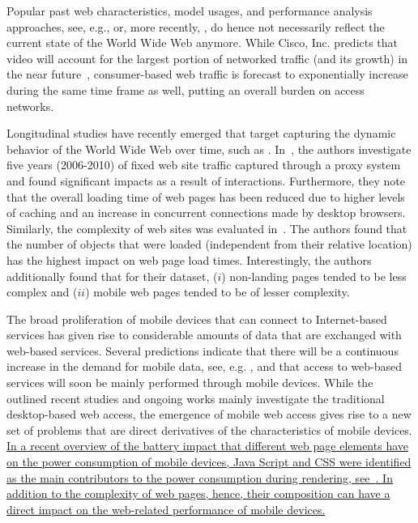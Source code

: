 \documentclass[onecolumn,12pt]{IEEEtran}
\begin{document}
Popular past web characteristics, model usages, and performance analysis approaches, see, e.g., \cite{BaCr98} or, more recently, \cite{LiZhZhChGr10}, do hence not necessarily reflect the current state of the World Wide Web anymore.
While Cisco, Inc. predicts that video will account for the largest portion of networked traffic (and its growth) in the near future~\cite{Ci13}, consumer-based web traffic is forecast to exponentially increase during the same time frame as well, putting an overall burden on access networks.

Longitudinal studies have recently emerged that target capturing the dynamic behavior of the World Wide Web over time, such as \cite{CaAlPa10}.
In~\cite{IhPa11}, the authors investigate five years (2006-2010) of fixed web site traffic captured through a proxy system and found significant impacts as a result of interactions.
Furthermore, they note that the overall loading time of web pages has been reduced due to higher levels of caching and an increase in concurrent connections made by desktop browsers.
Similarly, the complexity of web sites was evaluated in~\cite{BuMaSe11,BuMaSe13}. The authors found that the number of objects that were loaded (independent from their relative location) has the highest impact on web page load times.
Interestingly, the authors additionally found that for their dataset, ($i$) non-landing pages tended to be less complex and ($ii$) mobile web pages tended to be of lesser complexity.


The broad proliferation of mobile devices that can connect to Internet-based services has given rise to considerable amounts of data that are exchanged with web-based services. 
Several predictions indicate that there will be a continuous increase in the demand for mobile data, see, e.g. \cite{Ci13}, and that access to web-based services will soon be mainly performed through mobile devices.
While the outlined recent studies and ongoing works mainly investigate the traditional desktop-based web access, the emergence of mobile web access gives rise to a new set of problems that are direct derivatives of the characteristics of mobile devices.
\uline{In a recent overview of the battery impact that different web page elements have on the power consumption of mobile devices, Java Script and CSS were identified as the main contributors to the power consumption during rendering, see~\cite{ThAgNiBoSi12}.
In addition to the complexity of web pages, hence, their composition can have a direct impact  on the web-related performance of mobile devices.}
\end{document}
